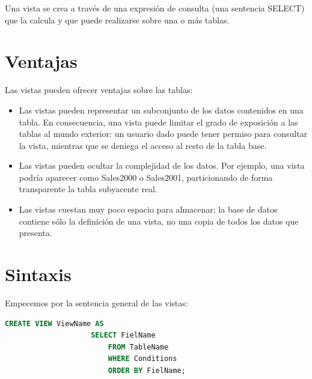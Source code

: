 \documentclass[12pt, fleqn]{report}                             %
\theoremstyle{break}                                            %
\begin{document}
        Una vista se crea a través de una expresión de consulta (una sentencia SELECT) que la calcula y que puede
        realizarse sobre una o más tablas.


        \section{Ventajas}

            Las vistas pueden ofrecer ventajas sobre las tablas:

            \begin{itemize}

                \item
                    Las vistas pueden representar un subconjunto de los datos contenidos en una tabla.
                    En consecuencia, una vista puede limitar el grado de exposición a las tablas al mundo exterior:
                    un usuario dado puede tener permiso para consultar la vista, mientras que se deniega el acceso
                    al resto de la tabla base.

                \item
                    Las vistas pueden ocultar la complejidad de los datos.
                    Por ejemplo, una vista podría aparecer como Sales2000 o Sales2001, particionando
                    de forma transparente la tabla subyacente real.

                \item 
                    Las vistas cuestan muy poco espacio para almacenar; la base de datos contiene sólo
                    la definición de una vista, no una copia de todos los datos que presenta.

            \end{itemize}



        \section{Sintaxis}

            Empecemos por la sentencia general de las vistas:

            \begin{lstlisting}[language=SQL, gobble=16]
                CREATE VIEW ViewName AS
                    SELECT FielName
                        FROM TableName
                        WHERE Conditions
                        ORDER BY FielName; 
            \end{lstlisting}
\end{document}

